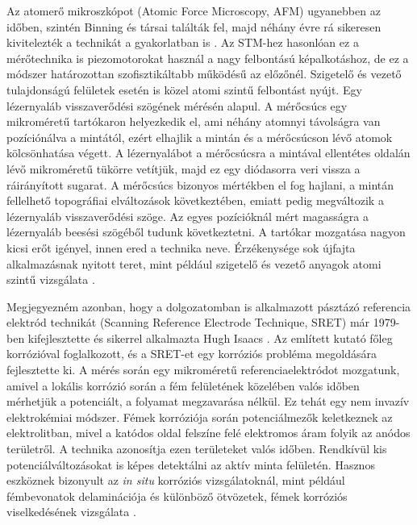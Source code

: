 Az atomerő mikroszkópot (Atomic Force Microscopy, AFM) ugyanebben az időben, szintén Binning és társai találták fel, majd néhány évre rá sikeresen kivitelezték a technikát a gyakorlatban is \cite{binnig1986atomic}. Az STM-hez hasonlóan ez a mérőtechnika is piezomotorokat használ a nagy felbontású képalkotáshoz, de ez a módszer határozottan szofisztikáltabb működésű az előzőnél. Szigetelő és vezető tulajdonságú felületek esetén is közel atomi szintű felbontást nyújt. Egy lézernyaláb visszaverődési szögének mérésén alapul. A mérőcsúcs egy mikroméretű tartókaron helyezkedik el, ami néhány atomnyi távolságra van pozíciónálva a mintától, ezért elhajlik a mintán és a mérőcsúcson lévő atomok kölcsönhatása végett. A lézernyalábot a mérőcsúcsra a mintával ellentétes oldalán lévő mikroméretű tükörre vetítjük, majd ez egy diódasorra veri vissza a ráirányított sugarat. A mérőcsúcs bizonyos mértékben el fog hajlani, a mintán fellelhető topográfiai elváltozások következtében, emiatt pedig megváltozik a lézernyaláb visszaverődési szöge. Az egyes pozícióknál mért magasságra a lézernyaláb beesési szögéből tudunk következtetni. A tartókar mozgatása nagyon kicsi erőt igényel, innen ered a technika neve. Érzékenysége sok újfajta alkalmazásnak nyitott teret, mint például szigetelő és vezető anyagok atomi szintű vizsgálata \cite{salapaka2008scanning}.

Megjegyezném azonban, hogy a dolgozatomban is alkalmazott pásztázó referencia elektród technikát (Scanning Reference Electrode Technique, SRET) már 1979-ben kifejlesztette és sikerrel alkalmazta Hugh Isaacs \cite{isaacs1981scanning}. Az említett kutató főleg korrózióval foglalkozott, és a SRET-et egy korróziós probléma megoldására fejlesztette ki. A mérés során egy mikroméretű referenciaelektródot mozgatunk, amivel a lokális korrózió során a fém felületének közelében valós időben mérhetjük a potenciált, a folyamat megzavarása nélkül. Ez tehát egy nem invazív elektrokémiai módszer. Fémek korróziója során potenciálmezők keletkeznek az elektrolitban, mivel a katódos oldal felszíne felé elektromos áram folyik az anódos területről. A technika azonosítja ezen területeket valós időben. Rendkívül kis potenciálváltozásokat is képes detektálni az aktív minta felületén. Hasznos eszköznek bizonyult az \emph{in situ} korróziós vizsgálatoknál, mint például fémbevonatok delaminációja és különböző ötvözetek, fémek korróziós viselkedésének vizsgálata \cite{maile2000evaluation, cui2001use}.


